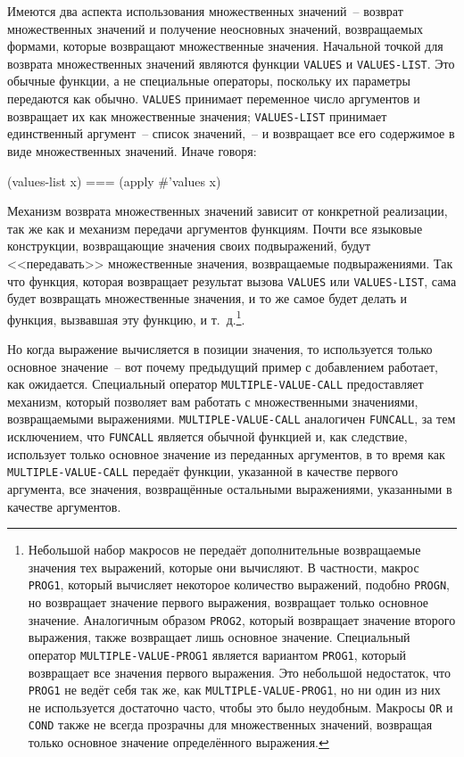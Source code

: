 Имеются два аспекта использования множественных значений~-- возврат мно\-жес\-твен\-ных
значений и получение неосновных значений, возвращаемых формами, которые возвращают
множественные значения.  Начальной точкой для возврата мно\-жес\-твен\-ных значений являются
функции \lstinline{VALUES} и \lstinline{VALUES-LIST}.  Это обычные функции, а не специальные
операторы, поскольку их параметры передаются как обычно.  \lstinline{VALUES} принимает переменное
число аргументов и возвращает их как множественные значения; \lstinline{VALUES-LIST} принимает
единственный аргумент~-- список значений,~-- и возвращает все его содержимое в виде
множественных значений.  Иначе говоря:

\begin{myverb}
  (values-list x) === (apply #'values x)
\end{myverb}

Механизм возврата множественных значений зависит от конкретной реализации, так же как и
механизм передачи аргументов функциям.  Почти все языковые конструкции, возвращающие
значения своих подвыражений, будут <<передавать>> множественные значения, возвращаемые
подвыражениями.  Так что функция, которая возвращает результат вызова \lstinline{VALUES} или
\lstinline{VALUES-LIST}, сама будет возвращать множественные значения, и то же самое будет
делать и функция, вызвавшая эту функцию, и т.~д.\footnote{Небольшой набор макросов не
  передаёт дополнительные возвращаемые значения тех выражений, которые они вычисляют.  В
  частности, макрос \lstinline{PROG1}, который вычисляет некоторое количество выражений,
  подобно \lstinline{PROGN}, но возвращает значение первого выражения, возвращает только
  основное значение.  Аналогичным образом \lstinline{PROG2}, который возвращает значение
  второго выражения, также возвращает лишь основное значение.  Специальный оператор
  \lstinline{MULTIPLE-VALUE-PROG1} является вариантом \lstinline{PROG1}, который возвращает все
  значения первого выражения.  Это небольшой недостаток, что \lstinline{PROG1} не ведёт себя
  так же, как \lstinline{MULTIPLE-VALUE-PROG1}, но ни один из них не используется достаточно
  часто, чтобы это было неудобным.  Макросы \lstinline{OR} и \lstinline{COND} также не всегда
  прозрачны для множественных значений, возвращая только основное значение определённого
  выражения.}\hspace{\footnotenegspace}.

Но когда выражение вычисляется в позиции значения, то используется только основное
значение~-- вот почему предыдущий пример с добавлением работает, как ожидается. Специальный
оператор \lstinline{MULTIPLE-VALUE-CALL} предоставляет механизм, который позволяет вам работать
с множественными значениями, возвращаемыми выражениями. \lstinline{MULTIPLE-VALUE-CALL}
аналогичен \lstinline{FUNCALL}, за тем исключением, что \lstinline{FUNCALL} является обычной
функцией и, как следствие, использует только основное значение из переданных аргументов,
в то время как \lstinline{MULTIPLE-VALUE-CALL} передаёт функции, указанной в качестве первого
аргумента, все значения, возвращённые остальными выражениями, указанными в качестве
аргументов.

